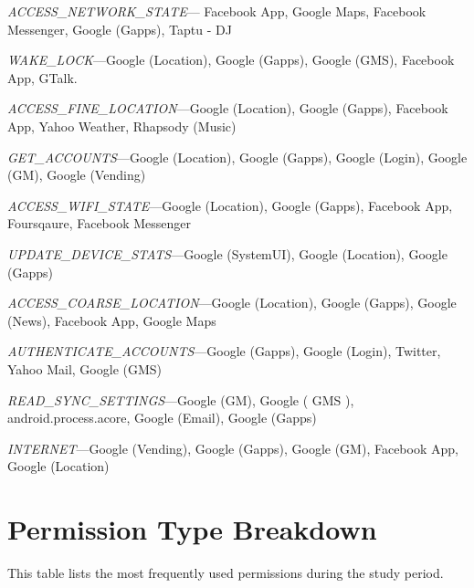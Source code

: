 \documentclass[letterpaper,twocolumn,10pt]{article}
\newenvironment{packed_item}{
\begin{itemize}
  \setlength{\itemsep}{1pt}
  \setlength{\parskip}{0pt}
  \setlength{\parsep}{0pt}
}{\end{itemize}}
\begin{document}
{\begin{packed_item}
\item {\it ACCESS\_NETWORK\_STATE}--- Facebook App, Google Maps, Facebook Messenger, Google (Gapps), Taptu - DJ
\item {\it WAKE\_LOCK}---Google (Location), Google (Gapps), Google (GMS), Facebook App, GTalk.
\item {\it ACCESS\_FINE\_LOCATION}---Google (Location), Google (Gapps), Facebook App, Yahoo Weather, Rhapsody (Music)
\item {\it GET\_ACCOUNTS}---Google (Location), Google (Gapps), Google (Login), Google (GM), Google (Vending)
\item {\it ACCESS\_WIFI\_STATE}---Google (Location), Google (Gapps), Facebook App, Foursqaure, Facebook Messenger
\item {\it UPDATE\_DEVICE\_STATS}---Google (SystemUI), Google (Location), Google (Gapps)
\item {\it ACCESS\_COARSE\_LOCATION}---Google (Location), Google (Gapps), Google (News), Facebook App, Google Maps
\item {\it AUTHENTICATE\_ACCOUNTS}---Google (Gapps), Google (Login), Twitter, Yahoo Mail, Google (GMS)
\item {\it READ\_SYNC\_SETTINGS}---Google (GM), Google ( GMS ), android.process.acore, Google (Email), Google (Gapps)
\item {\it INTERNET}---Google (Vending), Google (Gapps), Google (GM), Facebook App, Google (Location)
\end{packed_item}

\newpage

\section{Permission Type Breakdown}
\label{app:prem}

This table lists the most frequently used permissions during the study period.

}
\end{document}
